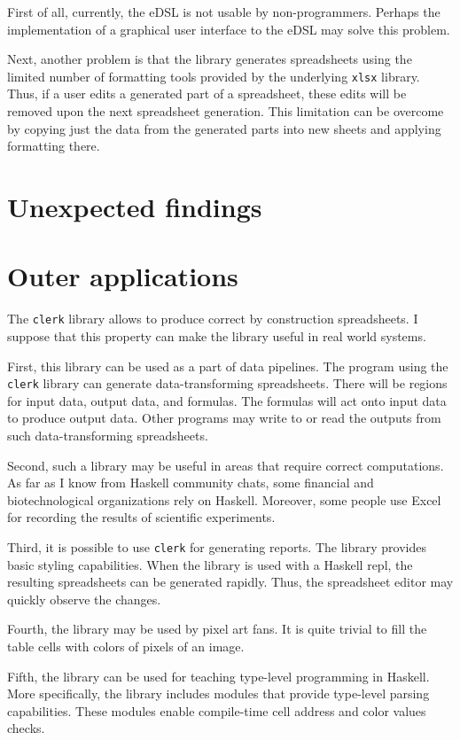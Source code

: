 First of all, currently, the eDSL is not usable by non-programmers.
Perhaps the implementation of a graphical user interface to the eDSL may solve this problem.

Next, another problem is that the library generates spreadsheets using the limited number of formatting tools provided by the underlying \texttt{xlsx} library.
Thus, if a user edits a generated part of a spreadsheet, these edits will be removed upon the next spreadsheet generation.
This limitation can be overcome by copying just the data from the generated parts into new sheets and applying formatting there.

\section{Unexpected findings}
\label{eval:unexpected}

\section{Outer applications}
\label{eval:outer-applications}

The \texttt{clerk} library allows to produce correct by construction spreadsheets.
I suppose that this property can make the library useful in real world systems.

First, this library can be used as a part of data pipelines.
The program using the \texttt{clerk} library can generate data-transforming spreadsheets.
There will be regions for input data, output data, and formulas.
The formulas will act onto input data to produce output data.
Other programs may write to or read the outputs from such data-transforming spreadsheets.

Second, such a library may be useful in areas that require correct computations.
As far as I know from Haskell community chats, some financial and biotechnological organizations rely on Haskell.
Moreover, some people use Excel for recording the results of scientific experiments.

Third, it is possible to use \texttt{clerk} for generating reports.
The library provides basic styling capabilities.
When the library is used with a Haskell repl, the resulting spreadsheets can be generated rapidly.
Thus, the spreadsheet editor may quickly observe the changes.

Fourth, the library may be used by pixel art fans.
It is quite trivial to fill the table cells with colors of pixels of an image.

Fifth, the library can be used for teaching type-level programming in Haskell.
More specifically, the library includes modules that provide type-level parsing capabilities.
These modules enable compile-time cell address and color values checks.


